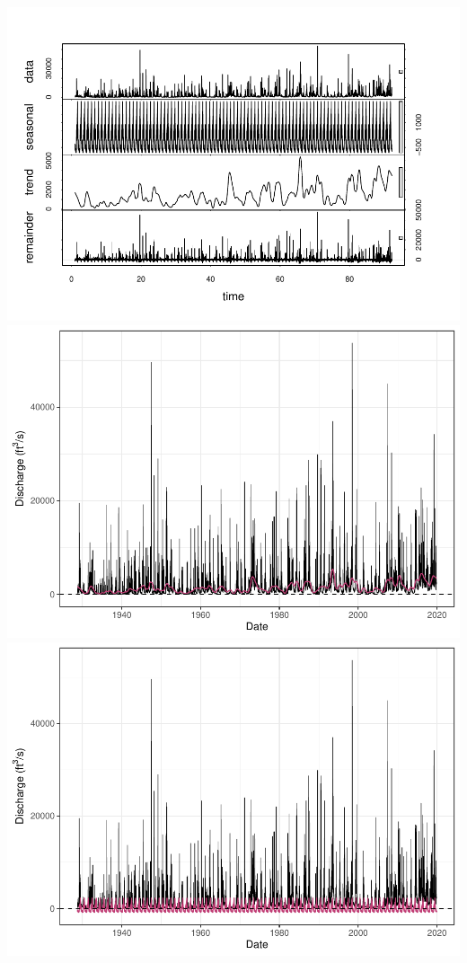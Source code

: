 \documentclass[12pt,]{article}
\begin{document}
\includegraphics{Project_Template_files/figure-latex/unnamed-chunk-6-2.pdf}
\includegraphics{Project_Template_files/figure-latex/unnamed-chunk-6-3.pdf}
\includegraphics{Project_Template_files/figure-latex/unnamed-chunk-6-4.pdf}
\end{document}
